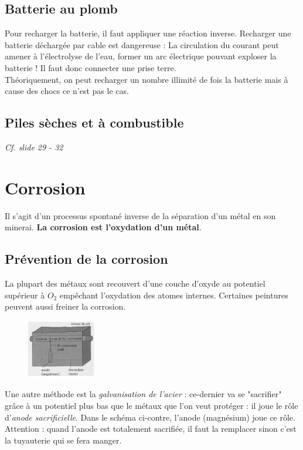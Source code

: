 \documentclass[british,french,11pt, a4paper, openany]{book}
\begin{document}
\subsection*{Batterie au plomb}
Pour recharger la batterie, il faut appliquer une réaction inverse. Recharger une batterie déchargée par cable est dangereuse : La circulation du courant peut amener à l'électrolyse de l'eau, former un arc électrique pouvant exploser la batterie ! Il faut donc connecter une prise terre.\\
Théoriquement, on peut recharger un nombre illimité de fois la batterie mais à cause des chocs ce n'est pas le cas.

\subsection*{Piles sèches et à combustible}
\textit{Cf. slide 29 - 32}

\section{Corrosion}
Il s'agit d'un processus spontané inverse de la séparation d'un métal en son minerai. \textbf{La corrosion est l'oxydation d'un métal}.

\subsection*{Prévention de la corrosion}
La plupart des métaux sont recouvert d'une couche d'oxyde au potentiel supérieur à $O_2$ empêchant l'oxydation des atomes internes. Certaines peintures peuvent aussi freiner la corrosion.\\

\begin{figure}
	\includegraphics[width=3cm]{image4.png}
\end{figure}
Une autre méthode est la \textit{galvanisation de l'acier} : ce-dernier va  se "sacrifier" grâce à un potentiel plus bas que le métaux que l'on veut protéger : il joue le rôle d'\textit{anode sacrificielle}. Dans le schéma ci-contre, l'anode (magnésium) joue ce rôle. Attention : quand l'anode est totalement sacrifiée, il faut la remplacer sinon c'est la tuyauterie qui se fera manger.
\end{document}
